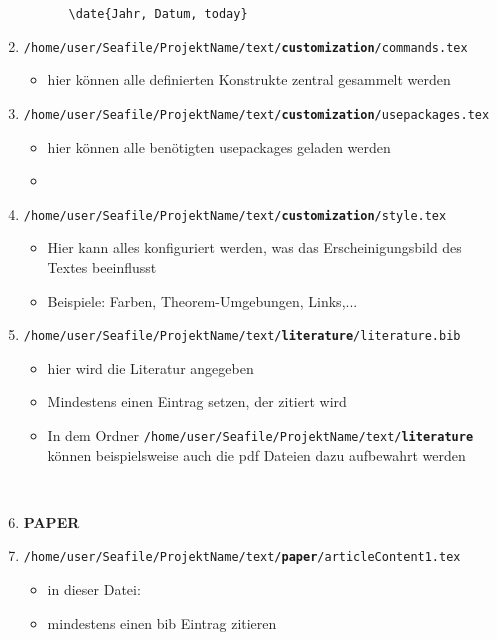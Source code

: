 \begin{enumerate}
\begin{itemize}
		~~~\texttt{\textbackslash date\{Jahr, Datum, today\}}	
	\end{itemize}
	\item \texttt{/home/user/Seafile/ProjektName/text/\textbf{customization}/commands.tex}
	\begin{itemize}
		\item hier können alle definierten Konstrukte zentral gesammelt werden 
	\end{itemize}
	\item \texttt{/home/user/Seafile/ProjektName/text/\textbf{customization}/usepackages.tex}
	\begin{itemize}
		\item hier können alle benötigten usepackages geladen werden 
		\item[] 
	\end{itemize}
	\item \texttt{/home/user/Seafile/ProjektName/text/\textbf{customization}/style.tex}
	\begin{itemize}
		\item Hier kann alles konfiguriert werden, was das Erscheinigungsbild des Textes beeinflusst
		\item Beispiele: Farben, Theorem-Umgebungen, Links,...
	\end{itemize}
	\item \texttt{/home/user/Seafile/ProjektName/text/\textbf{literature}/literature.bib}
	\begin{itemize}
		\item hier wird die Literatur angegeben
		\item Mindestens einen Eintrag setzen, der zitiert wird
		\item In dem Ordner \texttt{/home/user/Seafile/ProjektName/text/\textbf{literature}} können beispielsweise auch die pdf Dateien dazu aufbewahrt werden
	\end{itemize}
	~\\
	\item[] \textbf{\large PAPER}
	\item \texttt{/home/user/Seafile/ProjektName/text/\textbf{paper}/articleContent1.tex}\\
	\begin{itemize}
		\item in dieser Datei: \texttt{}
		\item mindestens einen bib Eintrag zitieren 

\end{itemize}
\end{enumerate}
